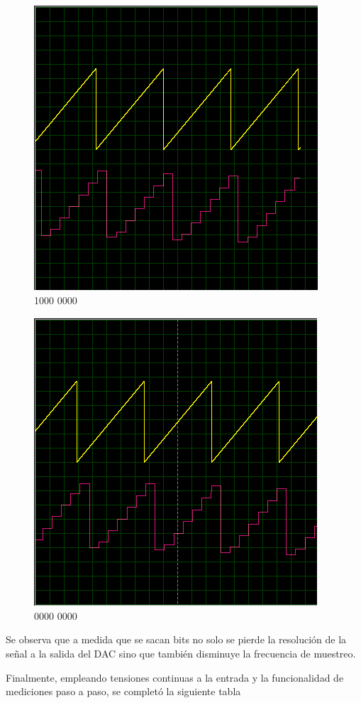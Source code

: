 \begin{multicols}{2}
\begin{figure}[H]
\centering
\includegraphics[width=0.5\linewidth]{ImagenesEjercicio1/bit7.png}
\caption{1000 0000}
\end{figure}
\begin{figure}[H]
\centering
\includegraphics[width=0.5\linewidth]{ImagenesEjercicio1/bit8.png}
\caption{0000 0000}
\end{figure}
\end{multicols}

Se observa que a medida que se sacan bits no solo se pierde la resolución de la señal a la salida del DAC sino que también disminuye la frecuencia de muestreo.

Finalmente, empleando tensiones continuas a la entrada y la funcionalidad de mediciones paso a paso, se completó la siguiente tabla

